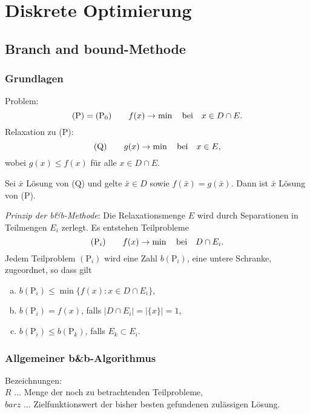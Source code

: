 \chapter{Diskrete Optimierung}
\section{Branch and bound-Methode}
\subsection{Grundlagen}
Problem:
\[ (\text{P}) = (\text{P}_0) \qquad f(x) \to \min \quad \text{bei} \quad x \in D \cap E. \]
Relaxation zu (P):
\[ (\text{Q}) \qquad g(x) \to \min \quad \text{bei} \quad x \in E, \]
wobei $g(x) \le f(x)$ für alle $x \in D \cap E$.

\begin{thm*}
  Sei $\bar{x}$ Lösung von (Q) und gelte $\bar{x} \in
  D$ sowie $f(\bar{x}) = g(\bar{x})$. Dann ist $\bar{x}$ Lösung von (P).
\end{thm*}

\emph{Prinzip der b\&b-Methode}: Die Relaxationsmenge $E$ wird durch
Separationen in Teilmengen $E_i$ zerlegt. Es entstehen Teilprobleme
\[ (\text{P}_i) \qquad f(x) \to \min \quad \text{bei} \quad D \cap E_i. \]
Jedem Teilproblem $(\text{P}_i)$ wird eine Zahl $b( \text{P}_i )$, eine untere
Schranke, zugeordnet, so dass gilt
\begin{enumerate}[(a)]
\item $b( \text{P}_i ) \le \min \{ f(x) : x \in D \cap E_i \}$,
\item $b( \text{P}_i ) = f(x)$, falls $|D \cap E_i| = |\{x\}| = 1$,
\item $b( \text{P}_i ) \le b( \text{P}_k )$, falls $E_k \subset E_i$.
\end{enumerate}

\subsection{Allgemeiner b\&b-Algorithmus}
Bezeichnungen: \\
$R$ ... Menge der noch zu betrachtenden Teilprobleme, \\
$bar{z}$ ... Zielfunktionswert der bisher besten gefundenen zulässigen Lösung.

